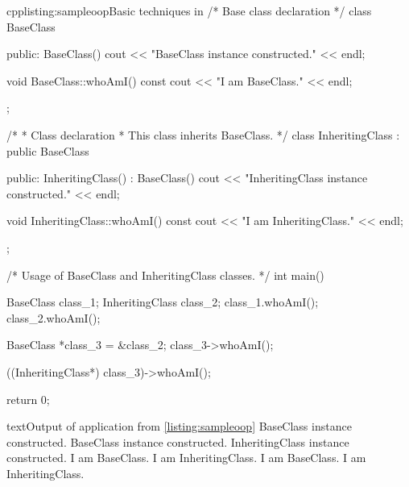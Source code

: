 \begin{fdoccode}{cpp}{listing:sampleoop}{Basic  techniques in \cpp}
/* Base class declaration */
class BaseClass {
    public:
		BaseClass() {
		    cout << "BaseClass instance constructed." << endl;
		}

		void BaseClass::whoAmI() const {
		    cout << "I am BaseClass." << endl;
		}
};

/*
 * Class declaration
 * This class inherits BaseClass.
 */
class InheritingClass : public BaseClass {
	public:
		InheritingClass() : BaseClass() {
		    cout << "InheritingClass instance constructed." << endl;
		}
		
		void InheritingClass::whoAmI() const {
		    cout << "I am InheritingClass." << endl;
		}
};

/* Usage of BaseClass and InheritingClass classes. */
int main() {
    BaseClass class_1;
    InheritingClass class_2;
    class_1.whoAmI();
    class_2.whoAmI();

    BaseClass *class_3 = &class_2;
    class_3->whoAmI();

    ((InheritingClass*) class_3)->whoAmI();

    return 0;
}
\end{fdoccode}

\begin{fdoccode}{text}{}{Output of application from \autoref{listing:sampleoop}}
BaseClass instance constructed.
BaseClass instance constructed.
InheritingClass instance constructed.
I am BaseClass.
I am InheritingClass.
I am BaseClass.
I am InheritingClass.
\end{fdoccode}

